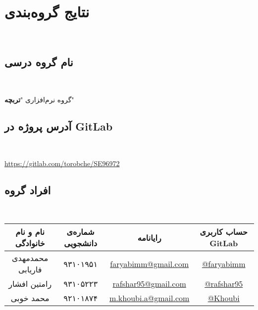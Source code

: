 
\section{نتایج گروه‌بندی}\ \\

\subsection{نام گروه درسی} \ \\
\begin{center}
گروه نرم‌افزاری "\textbf{تربچه}"	
\end{center}


\vspace*{1cm}

\subsection{آدرس پروژه در GitLab} \ \\
\begin{center}
\url{https://gitlab.com/torobche/SE96972}	
\end{center}


\vspace*{1cm}


\subsection{افراد گروه} \ \\
\begin{center}
\begin{tabular}{|c|c|c|c|}
\hline
نام و نام خانوادگی
	&
	شماره‌ی دانشجویی
	&
	رایانامه
	&
 حساب کاربری GitLab  \\ \hline

محمدمهدی فاریابی 
 &
 ۹۳۱۰۱۹۵۱
 &
 \url{faryabimm@gmail.com}
 &
 \url{@faryabimm}
  \\ \hline
 رامتین افشار
 &
 ۹۳۱۰۵۲۲۳
 &
 \url{rafshar95@gmail.com}
 & 
 \url{@rafshar95}
 \\ \hline
 محمد خوبی
 &
 ۹۲۱۰۱۸۷۴
 &
 \url{m.khoubi.a@gmail.com}
 &
 \url{@Khoubi}
  \\ \hline  
\end{tabular}
\end{center}


